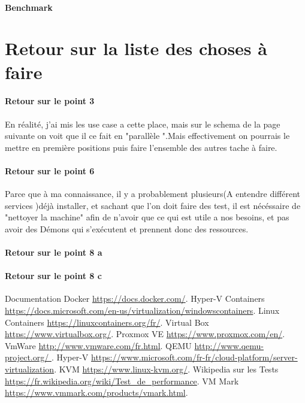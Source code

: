 \documentclass[french]{article}
\begin{document}
\paragraph{Benchmark}

\section{Retour sur la liste des choses à faire}

\paragraph{Retour sur le point 3}

En réalité, j'ai mis les use case a cette place, mais sur le schema de la page suivante on voit que il ce fait en "parallèle ".Mais effectivement on pourrais le mettre en première positions puis faire l'ensemble des autres tache à faire. 
\paragraph{Retour sur le point 6}
Parce que à ma connaissance, il y a probablement plusieurs(A entendre différent services  )déjà installer, et sachant que l'on doit faire des test, il est nécéssaire de "nettoyer la machine" afin de n'avoir que ce qui est utile a nos besoins, et pas avoir des Démons qui s’exécutent et prennent donc des ressources. 
\paragraph{Retour sur le point 8 a }
\paragraph{Retour sur le point 8 c }
\newpage
\begin{thebibliography}{9}

          Documentation Docker
          \url{https://docs.docker.com/}.
          Hyper-V Containers
          \url{https://docs.microsoft.com/en-us/virtualization/windowscontainers}.
         Linux Containers
         \url{https://linuxcontainers.org/fr/}.
         Virtual Box
         \url{ https://www.virtualbox.org/}.
         Proxmox VE
         \url{https://www.proxmox.com/en/}.
         VmWare
         \url{ http://www.vmware.com/fr.html}.
         QEMU
         \url{http://www.qemu-project.org/   }.
         Hyper-V
         \url{https://www.microsoft.com/fr-fr/cloud-platform/server-virtualization}.      
         KVM
         \url{https://www.linux-kvm.org/}.
         Wikipedia sur les Tests
         \url{https://fr.wikipedia.org/wiki/Test_de_performance}.
         VM Mark
         \url{https://www.vmmark.com/products/vmark.html}.
         
         
\end{thebibliography}
\end{document}
